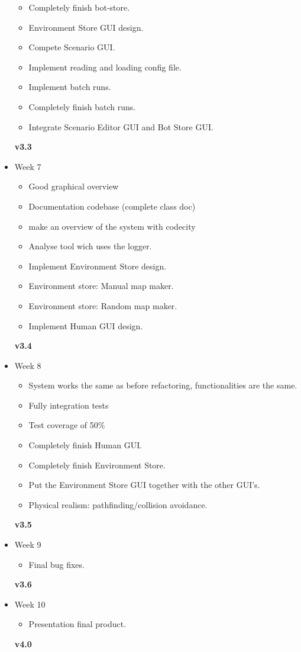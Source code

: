 \begin{itemize}
\begin{itemize}
    \item Completely finish bot-store.
    \item Environment Store GUI design.
    \item Compete Scenario GUI.
    \item Implement reading and loading config file.
    \item Implement batch runs.
    \item Completely finish batch runs.
    \item Integrate Scenario Editor GUI and Bot Store GUI.
  \end{itemize}
  \textbf{v3.3}
  \item Week 7
  \begin{itemize}
    \item Good graphical overview
      \item Documentation codebase (complete class doc)
      \item  make an overview of the system with codecity
      \item  Analyse tool wich uses the logger. 
    \item Implement Environment Store design.
    \item Environment store: Manual map maker.
    \item Environment store: Random map maker.
    \item Implement Human GUI design.
  \end{itemize}
  \textbf{v3.4}
  \item Week 8
  \begin{itemize}
    \item System works the same as before refactoring, functionalities are the same. 
        \item Fully integration tests
        \item Test coverage of 50\%
    \item Completely finish Human GUI.
    \item Completely finish Environment Store.
    \item Put the Environment Store GUI together with the other GUI's.
    \item Physical realism: \gls{pathfinding}/collision avoidance.
  \end{itemize}
  \textbf{v3.5}
  \item Week 9 
  \begin{itemize}
    \item Final bug fixes.
  \end{itemize}
  \textbf{v3.6}
  \item Week 10 
  \begin{itemize}
    \item Presentation final product.
  \end{itemize}
  \textbf{v4.0}
\end{itemize}

